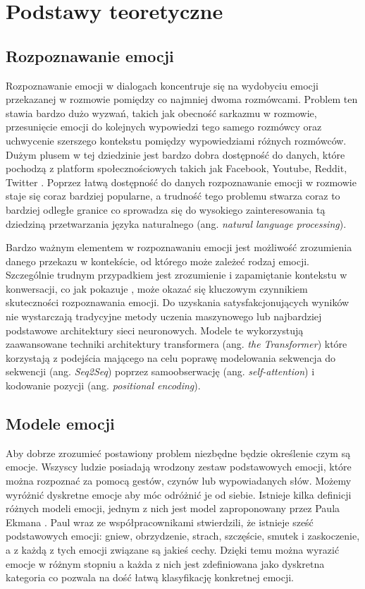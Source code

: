 \chapter{Podstawy teoretyczne}

\section{Rozpoznawanie emocji}

Rozpoznawanie emocji w dialogach koncentruje się na wydobyciu emocji przekazanej w rozmowie pomiędzy co najmniej dwoma rozmówcami. Problem ten stawia bardzo dużo wyzwań, takich jak obecność sarkazmu w rozmowie, przesunięcie emocji do kolejnych wypowiedzi tego samego rozmówcy oraz uchwycenie szerszego kontekstu pomiędzy wypowiedziami różnych rozmówców. Dużym plusem w tej dziedzinie jest bardzo dobra dostępność do danych, które pochodzą z platform społecznościowych takich jak Facebook, Youtube, Reddit, Twitter \cite{poria2019emotion}. Poprzez łatwą dostępność do danych rozpoznawanie emocji w rozmowie staje się coraz bardziej popularne, a trudność tego problemu stwarza coraz to bardziej odległe granice co sprowadza się do wysokiego zainteresowania tą dziedziną przetwarzania języka naturalnego (ang. \textit{natural language processing}).

Bardzo ważnym elementem w rozpoznawaniu emocji jest możliwość zrozumienia danego przekazu w kontekście, od którego może zależeć rodzaj emocji. Szczególnie trudnym przypadkiem jest zrozumienie i zapamiętanie kontekstu w konwersacji, co jak pokazuje \cite{zhong2019knowledgeenriched}, może okazać się kluczowym czynnikiem skuteczności rozpoznawania emocji. Do uzyskania satysfakcjonujących wyników nie wystarczają tradycyjne metody uczenia maszynowego lub najbardziej podstawowe architektury sieci neuronowych. Modele te wykorzystują zaawansowane techniki architektury transformera (ang. \textit{the Transformer}) \cite{vaswani2017attention} które korzystają z podejścia mającego na celu poprawę modelowania sekwencja do sekwencji (ang. \textit{Seq2Seq}) poprzez samoobserwację (ang. \textit{self-attention}) i kodowanie pozycji (ang. \textit{positional encoding}).

\section{Modele emocji}

Aby dobrze zrozumieć postawiony problem niezbędne będzie określenie czym są emocje. Wszyscy ludzie posiadają wrodzony zestaw podstawowych emocji, które można rozpoznać za pomocą gestów, czynów lub wypowiadanych słów. Możemy wyróżnić dyskretne emocje aby móc odróżnić je od siebie. Istnieje kilka definicji różnych modeli emocji, jednym z nich jest model zaproponowany przez Paula Ekmana \cite{ekman1993facial}.  Paul wraz ze współpracownikami stwierdzili, że istnieje sześć podstawowych emocji: gniew, obrzydzenie, strach, szczęście, smutek i zaskoczenie, a z każdą z tych emocji związane są jakieś cechy. Dzięki temu można wyrazić emocje w różnym stopniu a każda z nich jest zdefiniowana jako dyskretna kategoria co pozwala na dość łatwą klasyfikację konkretnej emocji.

